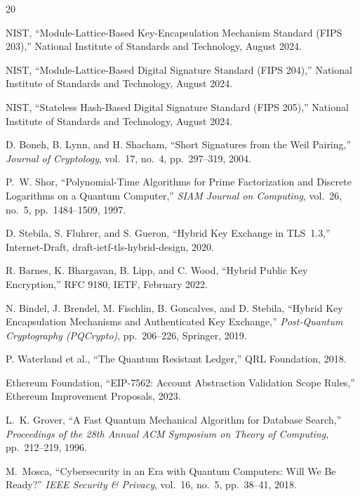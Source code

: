 \begin{thebibliography}{20}

NIST, ``Module-Lattice-Based Key-Encapsulation Mechanism Standard (FIPS 203),''
National Institute of Standards and Technology, August 2024.

NIST, ``Module-Lattice-Based Digital Signature Standard (FIPS 204),''
National Institute of Standards and Technology, August 2024.

NIST, ``Stateless Hash-Based Digital Signature Standard (FIPS 205),''
National Institute of Standards and Technology, August 2024.

D. Boneh, B. Lynn, and H. Shacham, ``Short Signatures from the Weil Pairing,''
\emph{Journal of Cryptology}, vol.~17, no.~4, pp.~297--319, 2004.

P.~W. Shor, ``Polynomial-Time Algorithms for Prime Factorization and Discrete
Logarithms on a Quantum Computer,'' \emph{SIAM Journal on Computing}, vol.~26,
no.~5, pp.~1484--1509, 1997.

D. Stebila, S. Fluhrer, and S. Gueron, ``Hybrid Key Exchange in TLS~1.3,''
Internet-Draft, draft-ietf-tls-hybrid-design, 2020.

R. Barnes, K. Bhargavan, B. Lipp, and C. Wood, ``Hybrid Public Key Encryption,''
RFC 9180, IETF, February 2022.

N. Bindel, J. Brendel, M. Fischlin, B. Goncalves, and D. Stebila, ``Hybrid Key
Encapsulation Mechanisms and Authenticated Key Exchange,'' \emph{Post-Quantum
Cryptography (PQCrypto)}, pp.~206--226, Springer, 2019.

P. Waterland et al., ``The Quantum Resistant Ledger,'' QRL Foundation, 2018.

Ethereum Foundation, ``EIP-7562: Account Abstraction Validation Scope Rules,''
Ethereum Improvement Proposals, 2023.

L.~K. Grover, ``A Fast Quantum Mechanical Algorithm for Database Search,''
\emph{Proceedings of the 28th Annual ACM Symposium on Theory of Computing},
pp.~212--219, 1996.

M.~Mosca, ``Cybersecurity in an Era with Quantum Computers: Will We Be Ready?''
\emph{IEEE Security \& Privacy}, vol.~16, no.~5, pp.~38--41, 2018.

\end{thebibliography}

